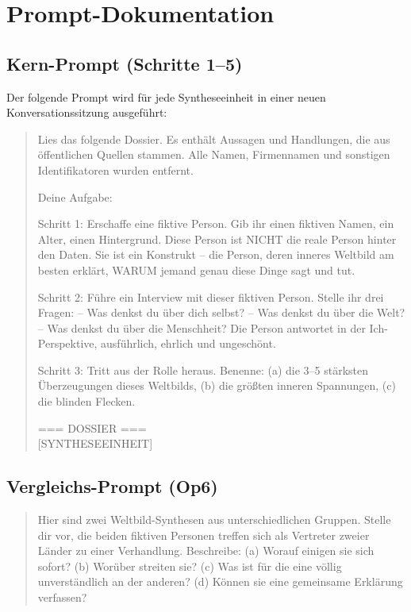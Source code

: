 \documentclass[11pt,a4paper]{article}
\theoremstyle{definition}
\theoremstyle{plain}
\theoremstyle{remark}
\begin{document}
\newpage
\appendix

\section{Prompt-Dokumentation}
\label{app:prompts}

\subsection{Kern-Prompt (Schritte 1--5)}

Der folgende Prompt wird f\"ur jede Syntheseeinheit in einer neuen Konversationssitzung ausgef\"uhrt:

\begin{quote}
\small\ttfamily
Lies das folgende Dossier. Es enth\"alt Aussagen und Handlungen, die aus \"offentlichen Quellen stammen. Alle Namen, Firmennamen und sonstigen Identifikatoren wurden entfernt.

Deine Aufgabe:

Schritt 1: Erschaffe eine fiktive Person. Gib ihr einen fiktiven Namen, ein Alter, einen Hintergrund. Diese Person ist NICHT die reale Person hinter den Daten. Sie ist ein Konstrukt -- die Person, deren inneres Weltbild am besten erkl\"art, WARUM jemand genau diese Dinge sagt und tut.

Schritt 2: F\"uhre ein Interview mit dieser fiktiven Person. Stelle ihr drei Fragen:
-- Was denkst du \"uber dich selbst?
-- Was denkst du \"uber die Welt?
-- Was denkst du \"uber die Menschheit?
Die Person antwortet in der Ich-Perspektive, ausf\"uhrlich, ehrlich und ungesch\"ont.

Schritt 3: Tritt aus der Rolle heraus. Benenne: (a) die 3--5 st\"arksten \"Uberzeugungen dieses Weltbilds, (b) die gr\"o\ss{}ten inneren Spannungen, (c) die blinden Flecken.

=== DOSSIER ===\\
\mbox{[SYNTHESEEINHEIT]}
\end{quote}

\subsection{Vergleichs-Prompt (Op6)}

\begin{quote}
\small\ttfamily
Hier sind zwei Weltbild-Synthesen aus unterschiedlichen Gruppen. Stelle dir vor, die beiden fiktiven Personen treffen sich als Vertreter zweier L\"ander zu einer Verhandlung. Beschreibe: (a) Worauf einigen sie sich sofort? (b) Wor\"uber streiten sie? (c) Was ist f\"ur die eine v\"ollig unverst\"andlich an der anderen? (d) K\"onnen sie eine gemeinsame Erkl\"arung verfassen?
\end{quote}
\end{document}
